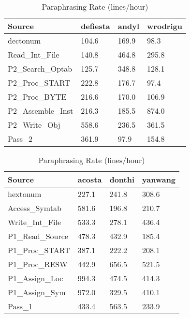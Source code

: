 \begin{table}[hb]
\begin{center}
\begin{tabular}{|l|l|l|l|}
\hline
Source & defiesta & andyl & wrodrigu\\
\hline
dectonum & 104.6 & 169.9 & 98.3\\
Read\_Int\_File & 140.8 & 464.8 & 295.8\\
P2\_Search\_Optab & 125.7 & 348.8 & 128.1\\
P2\_Proc\_START & 222.8 & 176.7 & 97.4\\
P2\_Proc\_BYTE & 216.6 & 170.0 & 106.9\\
P2\_Assemble\_Inst & 216.3 & 185.5 & 874.0\\
P2\_Write\_Obj & 558.6 & 236.5 & 361.5\\
Pass\_2 & 361.9 & 97.9 & 154.8\\
\hline
\end{tabular}
\end{center}
\caption{Paraphrasing Rate (lines/hour)}
\end{table}

\begin{table}[hb]
\begin{center}
\begin{tabular}{|l|l|l|l|}
\hline
Source & acosta & donthi & yanwang\\
\hline
hextonum & 227.1 & 241.8 & 308.6\\
Access\_Symtab & 581.6 & 196.8 & 210.7\\
Write\_Int\_File & 533.3 & 278.1 & 436.4\\
P1\_Read\_Source & 478.3 & 432.9 & 185.4\\
P1\_Proc\_START & 387.1 & 222.2 & 208.1\\
P1\_Proc\_RESW & 442.9 & 656.5 & 521.5\\
P1\_Assign\_Loc & 994.3 & 474.5 & 414.3\\
P1\_Assign\_Sym & 972.0 & 329.5 & 410.1\\
Pass\_1 & 433.4 & 563.5 & 233.9\\
\hline
\end{tabular}
\end{center}
\caption{Paraphrasing Rate (lines/hour)}
\end{table}


